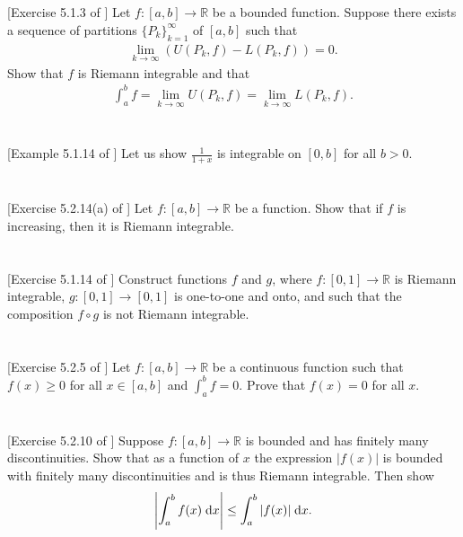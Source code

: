 \documentclass[11pt,letterpaper]{article}
\begin{document}
\section{} [Exercise 5.1.3 of \cite{Lebl_23}] 
Let $f:[a,b]\to\mathbb{R}$ be a bounded function. Suppose there exists a sequence of partitions $\{P_k\}^\infty_{k=1}$ of $[a,b]$ such that
\begin{align}
    \lim_{k\to\infty} (U(P_k,f)-L(P_k,f)) = 0.
\end{align}
Show that $f$ is Riemann integrable and that
\begin{align}
    \int^b_a f = \lim_{k\to\infty}U(P_k,f) = \lim_{k\to\infty}L(P_k,f).
\end{align}

\section{} [Example 5.1.14 of \cite{Lebl_23}] 
Let us show $\frac{1}{1+x}$ is integrable on $[0,b]$ for all $b>0$.


\section{} [Exercise 5.2.14(a) of \cite{Lebl_23}] 
Let $f:[a,b]\to\mathbb{R}$ be a  function. Show that if $f$ is increasing, then it is Riemann integrable.

\section{} [Exercise 5.1.14 of \cite{Lebl_23}] 
Construct functions $f$ and $g$, where $f:[0,1]\to \mathbb{R}$ is Riemann integrable, $g : [0, 1] \to [0, 1]$ is one-to-one and onto, and such that the composition $f\circ g$ is not Riemann integrable.

\section{} [Exercise 5.2.5 of \cite{Lebl_23}] 
Let $f:[a,b]\to\mathbb{R}$ be a continuous function such that $f(x)\geq 0$ for all $x\in[a,b]$ and $\int^b_a f = 0$. Prove that $f(x)=0$ for all $x$.

\section{} [Exercise 5.2.10 of \cite{Lebl_23}] 
Suppose $f:[a,b]\to\mathbb{R}$ is bounded and has finitely many discontinuities. Show that as a function of $x$ the expression $|f(x)|$ is bounded with finitely many discontinuities and is thus Riemann integrable. Then show
\begin{align}
    \left| \int^b_a f(x)\;\mathrm{d} x \right| \leq \int^b_a |f(x)|\;\mathrm{d} x.
\end{align}
\end{document}
